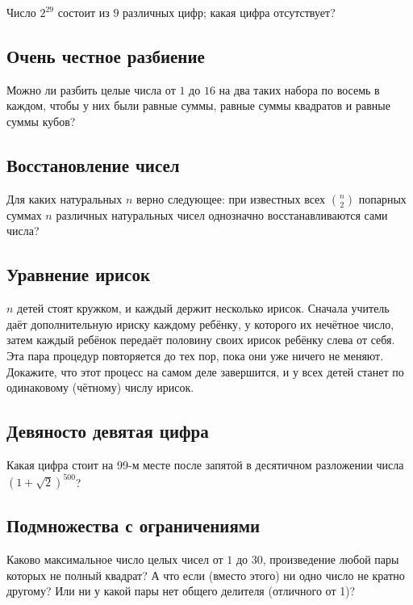 Число $2^{29}$ состоит из $9$ различных цифр; какая цифра отсутствует?

\subsection*{Очень честное разбиение}

Можно ли разбить целые числа от $1$ до $16$ на два таких набора по восемь в каждом,
чтобы у них были равные суммы, равные суммы квадратов и равные суммы кубов?

\subsection*{Восстановление чисел}

Для каких натуральных $n$ верно следующее: при известных всех $\binom n2$ попарных суммах $n$ различных натуральных чисел однозначно восстанавливаются сами числа?


\subsection*{Уравнение ирисок}

$n$ детей стоят кружком, и каждый держит несколько ирисок.
Сначала учитель даёт дополнительную ириску каждому ребёнку, у которого их нечётное число,
затем каждый ребёнок передаёт половину своих ирисок ребёнку слева от себя.
Эта пара процедур повторяется до тех пор, пока они уже ничего не меняют.
Докажите, что этот процесс на самом деле завершится, и у всех детей станет по одинаковому (чётному) числу ирисок.

\subsection*{Девяносто девятая цифра}

Какая цифра стоит на 99-м месте после запятой в десятичном разложении числа 
$(1+\sqrt2)^{500}$?

\subsection*{Подмножества с ограничениями}

Каково максимальное число целых чисел от $1$ до $30$, произведение любой пары которых не полный квадрат?
А что если (вместо этого) ни одно число не кратно другому?
Или ни у какой пары нет общего делителя (отличного от 1)?

